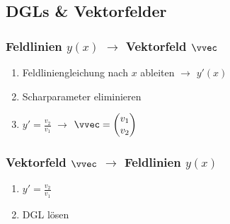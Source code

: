 \subsection{DGLs \& Vektorfelder}
    \vspace{0.5em}
    \subsubsection{Feldlinien $y(x)$ $\to$ Vektorfeld $\vvec$}
        \begin{enumerate}
            \item Feldliniengleichung nach $x$ ableiten $\to$ $y'(x)$
            \item Scharparameter eliminieren
            \item $\displaystyle y' = \frac{v_2}{v_1}$ $\to$ $\vvec = \begin{pmatrix} v_1\\v_2 \end{pmatrix}$
        \end{enumerate}
    \subsubsection{Vektorfeld $\vvec$ $\to$ Feldlinien $y(x)$}
        \vspace{0.5em}
        \begin{enumerate}
            \item $\displaystyle y' = \frac{v_2}{v_1}$
            \item DGL lösen
        \end{enumerate}